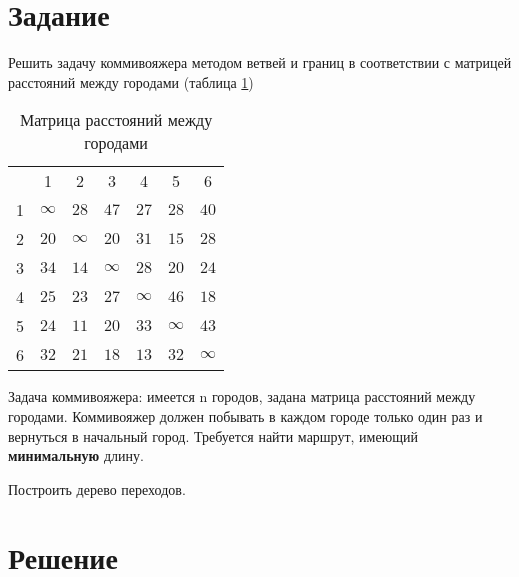 





\section{Задание}

Решить задачу коммивояжера методом ветвей и границ в соответствии с матрицей расстояний между городами (таблица \ref{tab:1})
 
\begin{table}[H]
\begin{center}
	\caption{Матрица расстояний между городами}
	\label{tab:1}
	\def\tabcolsep{18pt}
	\def\arraystretch{1.5}
	\fontsize{13}{14}\selectfont
	\begin{tabular}{|c||c|c|c|c|c|c|}
		\hline 
	  	& 1 & 2 & 3 & 4 & 5 & 6 \\ 
		\hhline{|=#=|=|=|=|=|=|} 
		1 & $\infty$ & $28$ & $47$ & $27$ & $28$ & $40$ \\ 
		\hline 
		2 & $20$ & $\infty$ & $20$ & $31$ & $15$ & $28$ \\ 
		\hline 
		3 & $34$ & $14$ & $\infty$ & $28$ & $20$ & $24$ \\ 
		\hline 
		4 & $25$ & $23$ & $27$ & $\infty$ & $46$ & $18$ \\ 
		\hline 
		5 & $24$ & $11$ & $20$ & $33$ & $\infty$ & $43$ \\ 
		\hline 
		6 & $32$ & $21$ & $18$ & $13$ & $32$ & $\infty$ \\ 
		\hline 
	\end{tabular}  
\end{center}
\end{table} 
 
Задача коммивояжера: имеется n городов, задана матрица расстояний между городами. Коммивояжер должен побывать в каждом городе только один раз и вернуться в начальный город. Требуется найти маршрут, имеющий \textbf{минимальную} длину. 
 
Построить дерево переходов.

\section{Решение}

